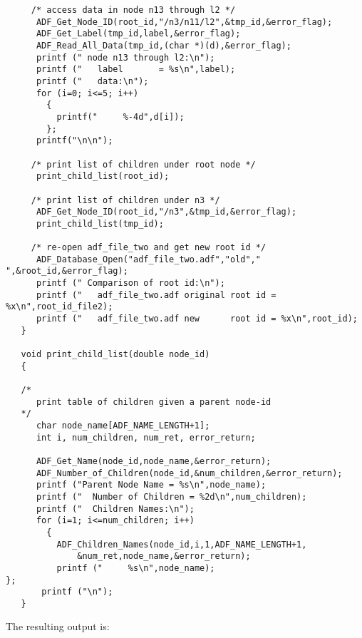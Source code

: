 \begin{verbatim}
     /* access data in node n13 through l2 */
      ADF_Get_Node_ID(root_id,"/n3/n11/l2",&tmp_id,&error_flag);
      ADF_Get_Label(tmp_id,label,&error_flag);
      ADF_Read_All_Data(tmp_id,(char *)(d),&error_flag);
      printf (" node n13 through l2:\n");
      printf ("   label       = %s\n",label);
      printf ("   data:\n");
      for (i=0; i<=5; i++)
        {
          printf("     %-4d",d[i]);
        };
      printf("\n\n");

     /* print list of children under root node */
      print_child_list(root_id);

     /* print list of children under n3 */
      ADF_Get_Node_ID(root_id,"/n3",&tmp_id,&error_flag);
      print_child_list(tmp_id);

     /* re-open adf_file_two and get new root id */
      ADF_Database_Open("adf_file_two.adf","old"," ",&root_id,&error_flag);
      printf (" Comparison of root id:\n");
      printf ("   adf_file_two.adf original root id = %x\n",root_id_file2);
      printf ("   adf_file_two.adf new      root id = %x\n",root_id);
   }

   void print_child_list(double node_id)
   {

   /*
      print table of children given a parent node-id
   */
      char node_name[ADF_NAME_LENGTH+1];
      int i, num_children, num_ret, error_return;

      ADF_Get_Name(node_id,node_name,&error_return);
      ADF_Number_of_Children(node_id,&num_children,&error_return);
      printf ("Parent Node Name = %s\n",node_name);
      printf ("  Number of Children = %2d\n",num_children);
      printf ("  Children Names:\n");
      for (i=1; i<=num_children; i++)
        {
          ADF_Children_Names(node_id,i,1,ADF_NAME_LENGTH+1,
              &num_ret,node_name,&error_return);
          printf ("     %s\n",node_name);                                };
       printf ("\n");
   }
\end{verbatim}

\noindent
The resulting output is:

